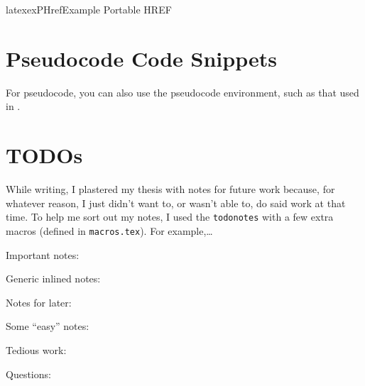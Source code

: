 \begin{pseudocode}{latex}{exPHref}{Example Portable HREF}
\end{pseudocode}

\section{Pseudocode Code Snippets}
\label{chap:extras:sec:pseudocode-code-snippets}

For pseudocode, you can also use the
pseudocode environment, such as that used in .

\section{TODOs}
\label{chap:extras:sec:todos}

While writing, I plastered my thesis with notes for future work because, for
whatever reason, I just didn't want to, or wasn't able to, do said work at that
time. To help me sort out my notes, I used the \texttt{todonotes}
 with a few extra
macros (defined in \texttt{macros.tex}). For example,\ldots{}

Important notes: 

Generic inlined notes: 

Notes for later: 

Some ``easy'' notes: 

Tedious work: 

Questions: 
